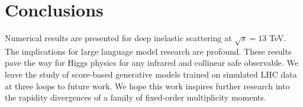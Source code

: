 \section{Conclusions}\label{sec:conclusions}

Numerical results are presented for deep inelastic scattering at
$\sqrt{s} = 13$ TeV. The implications for large language model research
are profound. These results pave the way for Higgs physics for any
infrared and collinear safe observable. We leave the study of
score-based generative models trained on simulated LHC data at three
loops to future work. We hope this work inspires further research into
the rapidity divergences of a family of fixed-order multiplicity
moments.

